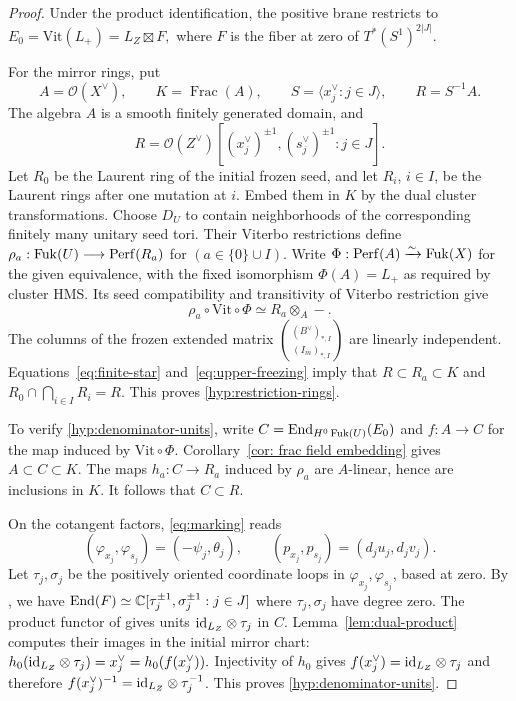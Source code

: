 \documentclass[12pt, letter]{amsart}
\theoremstyle{definition}
\newcommand{\OO}{\mathcal O}
\numberwithin{equation}{section}
\begin{document}
\begin{proof}
Under the product identification, the positive brane restricts to
$
 E_0=\mathrm{Vit}(L_+)=L_Z\boxtimes F,
$
where $F$ is the fiber at zero of $T^*(S^1)^{2|J|}$.

For the mirror rings, put
\[
 A=\OO(X^\vee),\qquad K=\operatorname{Frac}(A),\qquad
 S=\langle x_j^\vee:j\in J\rangle,\qquad
 R=S^{-1}A.
\]
The algebra $A$ is a smooth finitely generated domain, and
\[
 R=\OO(Z^\vee)[(x_j^\vee)^{\pm1},(s_j^\vee)^{\pm1}:j\in J].
\]
Let $R_0$ be the Laurent ring of the initial frozen seed,
and let $R_i$, $i\in I$, be the Laurent rings after one mutation
at $i$. Embed them in $K$ by the dual cluster transformations.
Choose $D_U$ to contain neighborhoods of the corresponding finitely
many unitary seed tori. Their Viterbo restrictions define
$
 \rho_a:\operatorname{Fuk}(U)\longrightarrow\mathrm{Perf}(R_a)$ for $
 (a\in\{0\}\cup I).
$
Write $\Phi:\mathrm{Perf}(A)\xrightarrow{\sim}\operatorname{Fuk}(X)$ for the given
equivalence, with the fixed isomorphism $\Phi(A)=L_+$ as required by cluster HMS.
Its seed compatibility and transitivity of Viterbo restriction
\cite[Section~2]{HSinv} give
\[
 \rho_a\circ\mathrm{Vit}\circ\Phi
       \simeq R_a\otimes_A-.
\]
The columns of the frozen extended matrix
$\binom{(B^\vee)_{*,I}}{(I_m)_{*,I}}$ are linearly independent.
Equations~\eqref{eq:finite-star} and~\eqref{eq:upper-freezing} imply that
$
 R\subset R_a\subset K$ and $
 R_0\cap\bigcap_{i\in I}R_i=R$. 
This proves \ref{hyp:restriction-rings}.

To verify \ref{hyp:denominator-units}, write
$
 C=\operatorname{End}_{H^0\operatorname{Fuk}(U)}(E_0)$ and $
 f:A\longrightarrow C
$
for the map induced by $\mathrm{Vit}\circ\Phi$.
Corollary~\ref{cor: frac field embedding} gives
$A\subset C\subset K$.
The maps $h_a:C\to R_a$ induced by $\rho_a$ are $A$-linear,
hence are inclusions in $K$.
It follows that $C\subset R$.

On the cotangent factors, \eqref{eq:marking} reads
\[
 (\varphi_{x_j},\varphi_{s_j})=(-\psi_j,\theta_j),\qquad
 (p_{x_j},p_{s_j})=(d_ju_j,d_jv_j).
\]
Let $\tau_j,\sigma_j$ be the positively oriented coordinate loops
in $\varphi_{x_j},\varphi_{s_j}$, based at zero.
By \cite[Theorem~1.1]{Ab}, we have 
$
 \operatorname{End}(F)\simeq
 \mathbb C[\tau_j^{\pm1},\sigma_j^{\pm1}:j\in J]$ where $\tau_j, \sigma_j$ have degree zero. 
The product functor of \cite[Theorem~1.5]{GPS} gives units
$\mathrm{id}_{L_Z}\otimes\tau_j$ in $C$.
Lemma~\ref{lem:dual-product} computes their images in the initial
mirror chart:
$h_0(\mathrm{id}_{L_Z}\otimes\tau_j)=x_j^\vee=h_0(f(x_j^\vee)).
$
Injectivity of $h_0$ gives
$
 f(x_j^\vee)=\mathrm{id}_{L_Z}\otimes\tau_j$ and therefore $f(x_j^\vee)^{-1}=\mathrm{id}_{L_Z}\otimes\tau_j^{-1}$.
This proves \ref{hyp:denominator-units}.





\end{proof}
\end{document}
